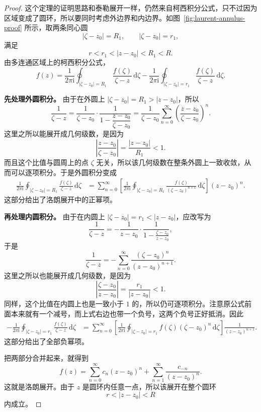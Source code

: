 \begin{proof}
这个定理的证明思路和泰勒展开一样，仍然来自柯西积分公式，只不过因为区域变成了圆环，所以要同时考虑外边界和内边界。如图~\ref{fig:laurent-annulus-proof} 所示，取两条同心圆
\[
    |\zeta-z_0|=R_1,\qquad |\zeta-z_0|=r_1,
\]
满足
\[
    r<r_1<|z-z_0|<R_1<R.
\]
由多连通区域上的柯西积分公式，
\[
    f(z)=\frac{1}{2\pi\mathrm{i}}
    \oint_{|\zeta-z_0|=R_1}\frac{f(\zeta)}{\zeta-z}\,\mathrm{d}\zeta
    -
    \frac{1}{2\pi\mathrm{i}}
    \oint_{|\zeta-z_0|=r_1}\frac{f(\zeta)}{\zeta-z}\,\mathrm{d}\zeta.
\]

\textbf{先处理外圆积分。} 由于在外圆上 $|\zeta-z_0|=R_1>|z-z_0|$，所以
\[
    \frac{1}{\zeta-z}
    = \frac{1}{\zeta-z_0}\cdot
    \frac{1}{1-\dfrac{z-z_0}{\zeta-z_0}}
    = \frac{1}{\zeta-z_0}\sum_{n=0}^{\infty}
    \left(\frac{z-z_0}{\zeta-z_0}\right)^n.
\]
这里之所以能展开成几何级数，是因为
\[
    \left|\frac{z-z_0}{\zeta-z_0}\right|
    = \frac{|z-z_0|}{R_1}<1.
\]
而且这个比值与圆周上的点 $\zeta$ 无关，所以该几何级数在整条外圆上一致收敛，从而可以逐项积分。于是外圆积分变成
\begin{align*}
    \frac{1}{2\pi\mathrm{i}}
    \oint_{|\zeta-z_0|=R_1}\frac{f(\zeta)}{\zeta-z}\,\mathrm{d}\zeta
    &=
    \sum_{n=0}^{\infty}
    \left[
        \frac{1}{2\pi\mathrm{i}}
        \oint_{|\zeta-z_0|=R_1}
        \frac{f(\zeta)}{(\zeta-z_0)^{n+1}}
        \,\mathrm{d}\zeta
    \right]
    (z-z_0)^n.
\end{align*}
这部分给出了洛朗展开中的正幂项。

\textbf{再处理内圆积分。} 由于在内圆上 $|\zeta-z_0|=r_1<|z-z_0|$，应改写为
\[
    \frac{1}{\zeta-z}
    = -\frac{1}{z-z_0}\cdot
    \frac{1}{1-\frac{\zeta-z_0}{z-z_0}},
\]
于是
\[
    \frac{1}{\zeta-z}
    = -\sum_{n=0}^{\infty}
    \frac{(\zeta-z_0)^n}{(z-z_0)^{n+1}}.
\]
这里之所以也能展开成几何级数，是因为
\[
    \left|\frac{\zeta-z_0}{z-z_0}\right|
    = \frac{r_1}{|z-z_0|}<1.
\]
同样，这个比值在内圆上也是一致小于 $1$ 的，所以仍可逐项积分。注意原公式前面本来就有一个减号，而上式右边也带一个负号，这两个负号正好抵消。因此
\begin{align*}
    -\frac{1}{2\pi\mathrm{i}}
    \oint_{|\zeta-z_0|=r_1}\frac{f(\zeta)}{\zeta-z}\,\mathrm{d}\zeta
    &=
    \sum_{n=0}^{\infty}
    \left[
        \frac{1}{2\pi\mathrm{i}}
        \oint_{|\zeta-z_0|=r_1}
        f(\zeta)(\zeta-z_0)^n\,\mathrm{d}\zeta
    \right]
    \frac{1}{(z-z_0)^{n+1}}.
\end{align*}
这部分给出了全部负幂项。

把两部分合并起来，就得到
\[
    f(z)=\sum_{n=0}^{\infty} c_n (z-z_0)^n
    + \sum_{n=1}^{\infty} \frac{c_{-n}}{(z-z_0)^n}.
\]
这就是洛朗展开。由于 $z$ 是圆环内任意一点，所以该展开在整个圆环
\[
    r<|z-z_0|<R
\]
内成立。
\end{proof}

